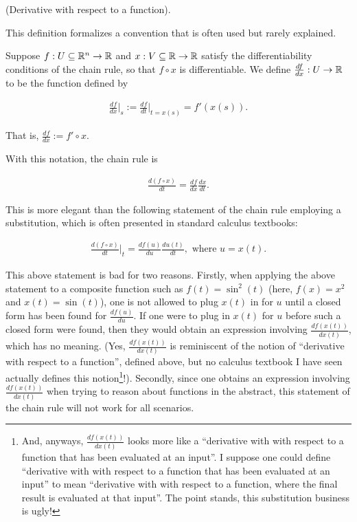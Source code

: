 \begin{defn}
\label{ch::calc::defn::deriv_wrt_fn}

    (Derivative with respect to a function).
    
    This definition formalizes a convention that is often used but rarely explained.
    
    Suppose $f:U \subseteq \mathbb{R}^n \rightarrow \mathbb{R}$ and $x:V \subseteq \mathbb{R} \rightarrow \mathbb{R}$ satisfy the differentiability conditions of the chain rule, so that $f \circ x$ is differentiable. We define $\frac{df}{dx}:U \rightarrow \mathbb{R}$ to be the function defined by
    
    \begin{align*}
        \frac{df}{dx}\Big|_s := \frac{df}{dt}\Big|_{t = x(s)} = f'(x(s)).
    \end{align*}
    
    That is, $\frac{df}{dx} := f' \circ x$.
    
    With this notation, the chain rule is

    \begin{align*}
        \frac{d(f \circ x)}{dt} = 
        \frac{df}{dx} \frac{dx}{dt}.
    \end{align*}

    This is more elegant than the following statement of the chain rule employing a substitution, which is often presented in standard calculus textbooks:

    \begin{align*}
        \frac{d(f \circ x)}{dt}\Big|_t = \frac{df(u)}{du} \frac{du(t)}{dt}, \text{ where } u = x(t).
    \end{align*}
    
    This above statement is bad for two reasons. Firstly, when applying the above statement to a composite function such as $f(t) = \sin^2(t)$ (here, $f(x) = x^2$ and $x(t) = \sin(t)$), one is not allowed to plug $x(t)$ in for $u$ until a closed form has been found for $\frac{df(u)}{du}$. If one were to plug in $x(t)$ for $u$ before such a closed form were found, then they would obtain an expression involving $\frac{df(x(t))}{dx(t)}$, which has no meaning. (Yes, $\frac{df(x(t))}{dx(t)}$ is reminiscent of the notion of ``derivative with respect to a function'', defined above, but no calculus textbook I have seen actually defines this notion\footnote{And, anyways, $\frac{df(x(t))}{dx(t)}$ looks more like a ``derivative with with respect to a function that has been evaluated at an input''. I suppose one could define ``derivative with with respect to a function that has been evaluated at an input'' to mean ``derivative with with respect to a function, where the final result is evaluated at that input''. The point stands, this substitution business is ugly!}!). Secondly, since one obtains an expression involving $\frac{df(x(t))}{dx(t)}$ when trying to reason about functions in the abstract, this statement of the chain rule will not work for all scenarios.
\end{defn}

